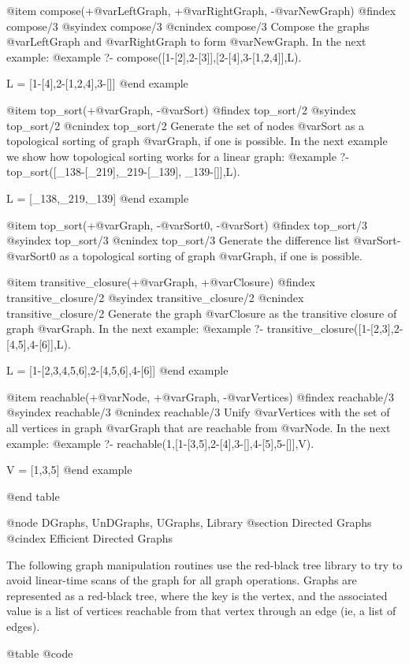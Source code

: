 {{{{{{{{{@item compose(+@var{LeftGraph}, +@var{RightGraph}, -@var{NewGraph})
@findex  compose/3
@syindex compose/3
@cnindex compose/3
Compose the graphs @var{LeftGraph} and @var{RightGraph} to form @var{NewGraph}.
 In the next example:
@example
?- compose([1-[2],2-[3]],[2-[4],3-[1,2,4]],L).

L = [1-[4],2-[1,2,4],3-[]]
@end example

@item top_sort(+@var{Graph}, -@var{Sort})
@findex  top_sort/2
@syindex top_sort/2
@cnindex top_sort/2
Generate the set of nodes @var{Sort} as a topological sorting of graph
@var{Graph}, if one is possible.
 In the next example we show how topological sorting works for a linear graph:
@example
?- top_sort([_138-[_219],_219-[_139], _139-[]],L).

L = [_138,_219,_139]
@end example

@item top_sort(+@var{Graph}, -@var{Sort0}, -@var{Sort})
@findex  top_sort/3
@syindex top_sort/3
@cnindex top_sort/3
Generate the difference list @var{Sort}-@var{Sort0} as a topological
sorting of graph @var{Graph}, if one is possible.

@item transitive_closure(+@var{Graph}, +@var{Closure})
@findex  transitive_closure/2
@syindex transitive_closure/2
@cnindex transitive_closure/2
Generate the graph @var{Closure} as the transitive closure of graph
@var{Graph}.
 In the next example:
@example
?- transitive_closure([1-[2,3],2-[4,5],4-[6]],L).

L = [1-[2,3,4,5,6],2-[4,5,6],4-[6]]
@end example

@item reachable(+@var{Node}, +@var{Graph}, -@var{Vertices})
@findex  reachable/3
@syindex reachable/3
@cnindex reachable/3
Unify @var{Vertices} with the set of all vertices in graph
@var{Graph} that are reachable from @var{Node}. In the next example:
@example
?- reachable(1,[1-[3,5],2-[4],3-[],4-[5],5-[]],V).

V = [1,3,5]
@end example

@end table

@node DGraphs, UnDGraphs, UGraphs, Library
@section Directed Graphs
@cindex Efficient Directed Graphs

The following graph manipulation routines use the red-black tree library
to try to avoid linear-time scans of the graph for all graph
operations. Graphs are represented as a red-black tree, where the key is
the vertex, and the associated value is a list of vertices reachable
from that vertex through an edge (ie, a list of edges). 

@table @code

}}}}}}}}}
